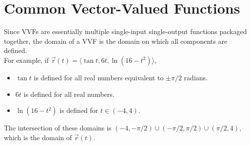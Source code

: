 \section{Common Vector-Valued Functions}



\noindent
Since VVFs are essentially multiple single-input single-output functions packaged together, the domain of a VVF is the domain on which all components are defined.\\

\noindent
For example, if $\vec{r}(t) = \langle \tan{t},6t,\ln{\left(16-t^2\right)} \rangle$,
\begin{itemize}
	\item $\tan{t}$ is defined for all real numbers equivalent to $\pm\pi/2$ radians.
	\item $6t$ is defined for all real numbers.
	\item $\ln{\left(16-t^2\right)}$ is defined for $t\in\left(-4,4\right)$.
\end{itemize}
The intersection of these domains is $\left(-4, -\pi/2\right) \cup \left(-\pi/2, \pi/2\right) \cup \left(\pi/2, 4\right)$, which is the domain of $\vec{r}(t)$.
